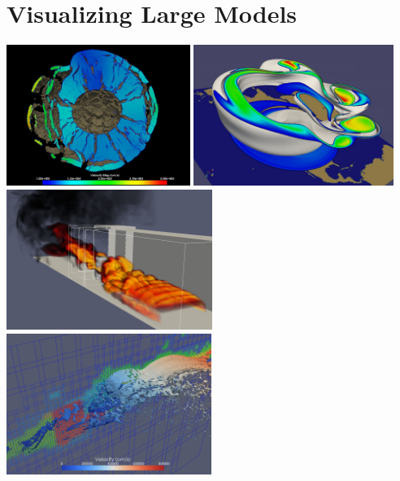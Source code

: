 \chapter{Visualizing Large Models}
\label{chap:VisualizingLargeModels}

\begin{inlinefig}
  \includegraphics[height=1.8in]{images/Asteroid}
  \includegraphics[height=1.8in]{images/PolarVortex} \\ \vspace{.5ex}
  \includegraphics[height=1.8in]{images/Fire}
  \includegraphics[height=1.8in]{images/LargeAMR}
\end{inlinefig}

